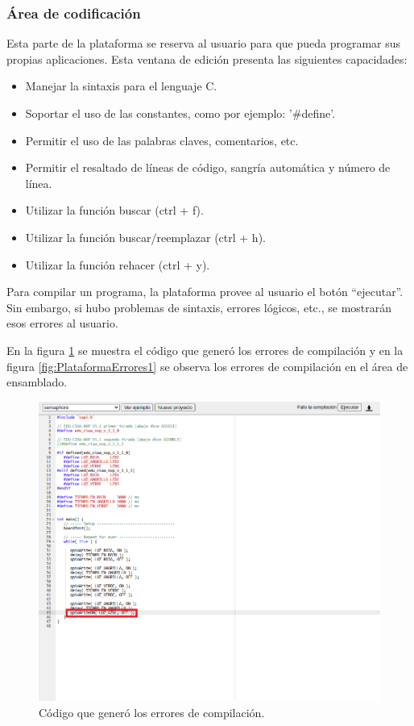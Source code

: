 \subsubsection{Área de codificación}

Esta parte de la plataforma se reserva al usuario para que pueda programar sus propias aplicaciones. Esta ventana de edición presenta las siguientes capacidades:

\begin{itemize}
\item Manejar la sintaxis para el lenguaje C.
\item Soportar el uso de las constantes, como por ejemplo: '\#define'.
\item Permitir el uso de las palabras claves, comentarios, etc.
\item Permitir el resaltado de líneas de código, sangría automática y número de línea.
\item Utilizar la función buscar (ctrl + f).
\item Utilizar la función buscar/reemplazar (ctrl + h).
\item Utilizar la función rehacer (ctrl + y).
\end{itemize}


Para compilar un programa, la plataforma provee al usuario el botón “ejecutar”. Sin embargo, si hubo problemas de sintaxis, errores lógicos, etc., se mostrarán esos errores al usuario.

En la figura \ref{fig:PlataformaErrores2} se muestra el código que generó los errores de compilación y en la figura \ref{fig:PlataformaErrores1} se observa los errores de compilación en el área de ensamblado.



\begin{figure}[ht]
	\centering
	\includegraphics[scale=.46]{./Figures/PlataformaErrores1.png}
	\caption{Código que generó los errores de compilación.}
	\label{fig:PlataformaErrores2}
\end{figure}



